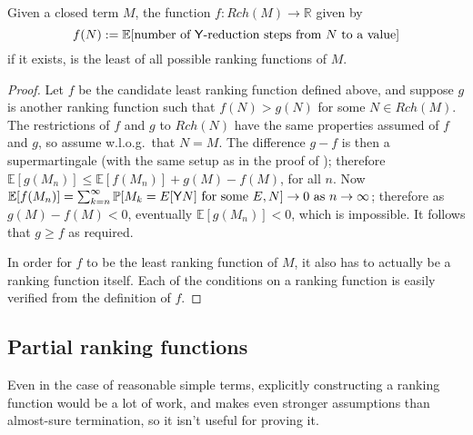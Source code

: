 \begin{theorem} \label{thm:minimal}
Given a closed term $M$, the function $f:Rch(M) \to \mathbb R$ given by 
\[
f(N) := \mathbb E [\text{number of }\mathsf{Y}\text{-reduction steps from }N\text{ to a value}]
\] 
if it exists, is the least of all possible ranking functions of $M$.
\end{theorem}
\begin{proof}
Let $f$ be the candidate least ranking function defined above, and suppose $g$ is another ranking function such that $f(N) > g(N)$ for some $N \in Rch(M)$. The restrictions of $f$ and $g$ to $Rch(N)$ have the same properties assumed of $f$ and $g$, so assume w.l.o.g.~that $N=M$. The difference $g - f$ is then a supermartingale (with the same setup as in the proof of %
);
therefore $\mathbb E[g(M_n)] \leq \mathbb E[f(M_n)] + g(M)-f(M)$, for all $n$.
Now $\mathbb E[f(M_n)] = \sum_{k=n}^\infty \mathbb P[M_k = E[\mathsf{Y} N] \text{ for some }E, N] \to 0 \text{ as } n \to \infty$; 
therefore as $g(M) - f(M) < 0$, eventually $\mathbb E[g(M_n)] < 0$, which is impossible. 
It follows that $g \geq f$ as required.

In order for $f$ to be the least ranking function of $M$, it also has to actually be a ranking function itself. Each of the conditions on a ranking function is easily verified from the definition of $f$.
\end{proof}

\subsection{Partial ranking functions}
Even in the case of reasonable simple terms, explicitly constructing a ranking function would be a lot of work, and  makes even stronger assumptions than almost-sure termination, so it isn't useful for proving it.

